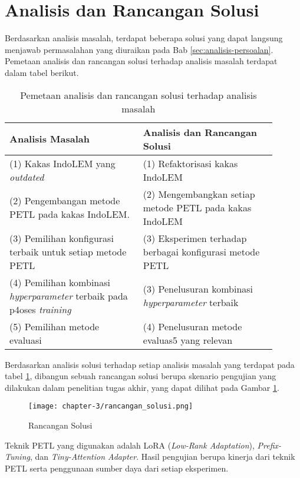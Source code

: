 \section{Analisis dan Rancangan Solusi}

Berdasarkan analisis masalah, terdapat beberapa solusi yang dapat langsung menjawab permasalahan yang diuraikan pada Bab \ref{sec:analisis-persoalan}. Pemetaan analisis dan rancangan solusi terhadap analisis masalah terdapat dalam tabel berikut.

\begin{table}[h!]
    \centering
    \begin{tabular}{|m{0.45\linewidth}|m{0.45\linewidth}|}
    \hline
    \rowcolor{black!10}
    \textbf{Analisis Masalah} & \textbf{Analisis dan Rancangan Solusi} \\ \hline
    (1) Kakas IndoLEM yang \textit{outdated} & (1) Refaktorisasi kakas IndoLEM \\ \hline
    (2) Pengembangan metode PETL pada kakas IndoLEM. & (2) Mengembangkan setiap metode PETL pada kakas IndoLEM \\ \hline
    (3) Pemilihan konfigurasi terbaik untuk setiap metode PETL & (3) Eksperimen terhadap berbagai konfigurasi metode PETL \\ \hline
    (4) Pemilihan kombinasi \textit{hyperparameter} terbaik pada p4oses \textit{training} & (3) Penelusuran kombinasi \textit{hyperparameter} terbaik\\ \hline
    (5) Pemilihan metode evaluasi & (4) Penelusuran metode evaluas5 yang relevan \\ \hline
    \end{tabular}
\caption{Pemetaan analisis dan rancangan solusi terhadap analisis masalah}
\label{table:pemetaan-masalah-solusi}
\end{table}

Berdasarkan analisis solusi terhadap setiap analisis masalah yang terdapat pada tabel \ref{table:pemetaan-masalah-solusi}, dibangun sebuah rancangan solusi berupa skenario pengujian yang dilakukan dalam penelitian tugas akhir, yang dapat dilihat pada Gambar \ref{fig:rancangan-solusi}.

\begin{figure}[ht]
    \centering
    \texttt{[image: chapter-3/rancangan\_solusi.png]}
    \caption{Rancangan Solusi}
    \label{fig:rancangan-solusi}
\end{figure}

Teknik PETL yang digunakan adalah LoRA (\textit{Low-Rank Adaptation}), \textit{Prefix-Tuning}, dan \textit{Tiny-Attention Adapter}. Hasil pengujian berupa kinerja dari teknik PETL serta penggunaan sumber daya dari setiap eksperimen.